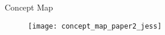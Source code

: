 \begin{frame}[t]{Concept Map} 
    \begin{figure}
        \texttt{[image: concept\_map\_paper2\_jess]}
    \end{figure}
\end{frame}


